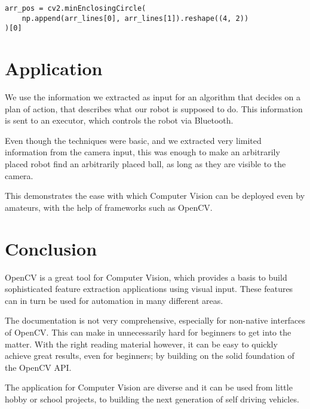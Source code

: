 \documentclass[12pt, a4paper]{article}
\begin{document}
\begin{lstlisting}
arr_pos = cv2.minEnclosingCircle(
    np.append(arr_lines[0], arr_lines[1]).reshape((4, 2))
)[0]
\end{lstlisting}

\section{Application}
We use the information we extracted as input for an algorithm that decides on a plan of action, that describes what our robot is supposed to do. This information is sent to an executor, which controls the robot via Bluetooth.

Even though the techniques were basic, and we extracted very limited information from the camera input, this was enough to make an arbitrarily placed robot find an arbitrarily placed ball, as long as they are visible to the camera.

This demonstrates the ease with which Computer Vision can be deployed even by amateurs, with the help of frameworks such as OpenCV.

\section{Conclusion}
OpenCV is a great tool for Computer Vision, which provides a basis to build sophisticated feature extraction applications using visual input. These features can in turn be used for automation in many different areas.

The documentation is not very comprehensive, especially for non-native interfaces of OpenCV. This can make in unnecessarily hard for beginners to get into the matter. With the right reading material however, it can be easy to quickly achieve great results, even for beginners; by building on the solid foundation of the OpenCV API.

The application for Computer Vision are diverse and it can be used from little hobby or school projects, to building the next generation of self driving vehicles.
\end{document}
